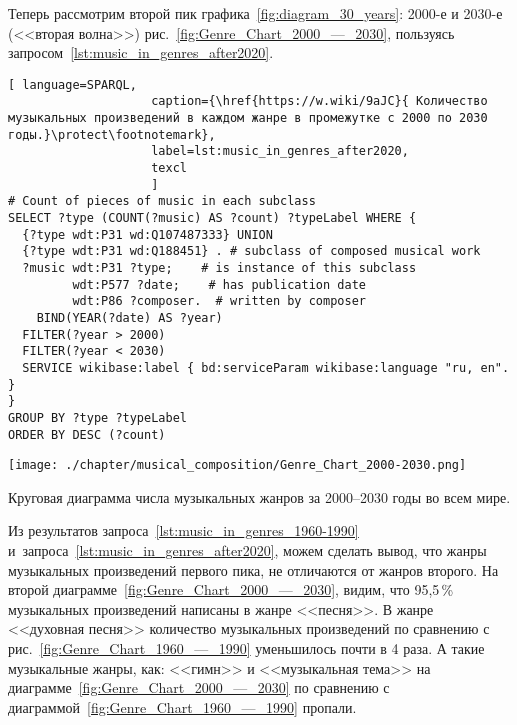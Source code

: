 

Теперь рассмотрим второй пик графика~\ref{fig:diagram_30_years}: 2000-е и 2030-е (<<вторая волна>>) рис.~\ref{fig:Genre_Chart_2000_—_2030}, пользуясь запросом~\ref{lst:music_in_genres_after2020}.

\begin{lstlisting}[ language=SPARQL,
                    caption={\href{https://w.wiki/9aJC}{ Количество музыкальных произведений в каждом жанре в промежутке с 2000 по 2030 годы.}\protect\footnotemark},
                    label=lst:music_in_genres_after2020,
                    texcl 
                    ]
# Count of pieces of music in each subclass
SELECT ?type (COUNT(?music) AS ?count) ?typeLabel WHERE {
  {?type wdt:P31 wd:Q107487333} UNION 
  {?type wdt:P31 wd:Q188451} . # subclass of composed musical work
  ?music wdt:P31 ?type;    # is instance of this subclass
         wdt:P577 ?date;    # has publication date
         wdt:P86 ?composer.  # written by composer
    BIND(YEAR(?date) AS ?year)
  FILTER(?year > 2000)        
  FILTER(?year < 2030)
  SERVICE wikibase:label { bd:serviceParam wikibase:language "ru, en". }
}
GROUP BY ?type ?typeLabel
ORDER BY DESC (?count)
\end{lstlisting}%

\begin{marginfigure}[0\baselineskip]
	\texttt{[image: ./chapter/musical\_composition/Genre\_Chart\_2000-2030.png]}
	\caption{Круговая диаграмма числа музыкальных жанров за 2000--2030 годы во всем мире.}%
	\label{fig:Genre_Chart_2000_—_2030}%
\end{marginfigure}

Из результатов запроса~\ref{lst:music_in_genres_1960-1990} 
и~запроса~\ref{lst:music_in_genres_after2020}, можем сделать вывод, 
что жанры музыкальных произведений первого пика, не отличаются от жанров второго. 
На второй диаграмме~\ref{fig:Genre_Chart_2000_—_2030}, видим, что 95,5\,\% музыкальных произведений написаны в жанре <<песня>>. В жанре <<духовная песня>> количество музыкальных произведений по сравнению с рис.~\ref{fig:Genre_Chart_1960_—_1990} уменьшилось почти в 4 раза. А такие музыкальные жанры, как: <<гимн>> и <<музыкальная тема>> на диаграмме~\ref{fig:Genre_Chart_2000_—_2030} по сравнению с диаграммой~\ref{fig:Genre_Chart_1960_—_1990} пропали.

